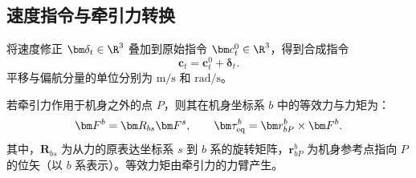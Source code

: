 \subsection{速度指令与牵引力转换}

将速度修正 $\bm\delta_t\in\R^3$ 叠加到原始指令 $\bm c^0_t\in\R^3$，得到合成指令
\begin{equation}
\bm c_t=\bm c^0_t+\bm\delta_t.
\label{eq:compose}
\end{equation}
平移与偏航分量的单位分别为 $\mathrm{m/s}$ 和 $\mathrm{rad/s}$。

若牵引力作用于机身之外的点 $P$，则其在机身坐标系 $b$ 中的等效力与力矩为：
\begin{equation}
\bm F^b=\bm R_{bs}\bm F^s,
\qquad \bm\tau_{\rm eq}^b=\bm r_{bP}^b\times\bm F^b.
\label{eq:force-transform}
\end{equation}
其中，$\bm R_{bs}$ 为从力的原表达坐标系 $s$ 到 $b$ 系的旋转矩阵，$\bm r_{bP}^b$ 为机身参考点指向 $P$ 的位矢（以 $b$ 系表示）。等效力矩由牵引力的力臂产生。
